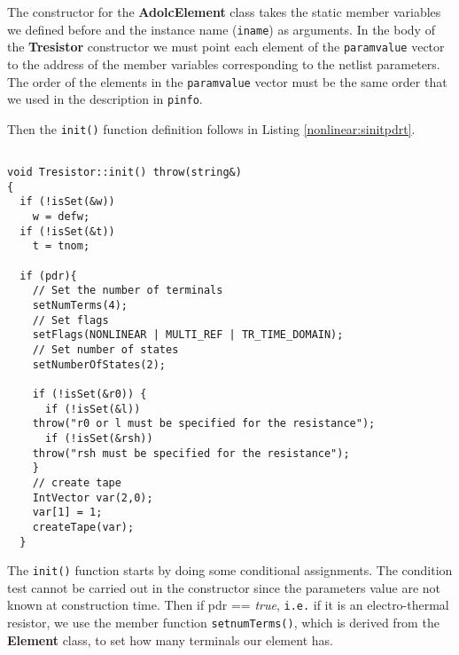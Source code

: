 The constructor for the \textbf{AdolcElement} class takes the static
member variables we defined before and the instance name
(\texttt{iname}) as arguments. In the body of the \textbf{Tresistor}
constructor we must point each element of the \texttt{paramvalue}
vector to the address of the member variables corresponding to the
netlist parameters. The order of the elements in the
\texttt{paramvalue} vector must be the same order that we used in the
description in \texttt{pinfo}.

Then the \texttt{init()} function definition follows in Listing
\ref{nonlinear:sinitpdrt}.

\begin{lstlisting}[firstnumber=54, label={nonlinear:sinitpdrt},
    caption={Initialization function of Tresistor.cc}]

void Tresistor::init() throw(string&)
{
  if (!isSet(&w))
    w = defw;
  if (!isSet(&t))
    t = tnom;

  if (pdr){
    // Set the number of terminals
    setNumTerms(4);
    // Set flags
    setFlags(NONLINEAR | MULTI_REF | TR_TIME_DOMAIN);
    // Set number of states
    setNumberOfStates(2);

    if (!isSet(&r0)) {
      if (!isSet(&l))
    throw("r0 or l must be specified for the resistance");
      if (!isSet(&rsh))
    throw("rsh must be specified for the resistance");
    }
    // create tape
    IntVector var(2,0);
    var[1] = 1;
    createTape(var);
  }
\end{lstlisting}

The \texttt{init()} function starts by doing some conditional assignments.
The condition test cannot be carried out in the constructor since the
parameters value are not known at construction time. Then if pdr == \emph{true},
\texttt{i.e.}
if it is an electro-thermal resistor, we use the member function
\texttt{setnumTerms()},
which is derived from the \textbf{Element} class, to set how many terminals
our element
has.

